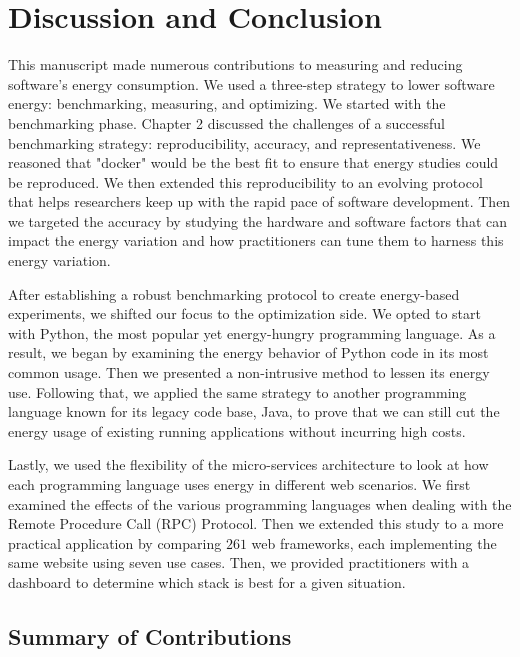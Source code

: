 \clearpage
\chapter{Discussion and Conclusion}
\label{chapter:conclusion}

This manuscript made numerous contributions to measuring and reducing software's energy consumption. We used a three-step strategy to lower software energy:  benchmarking, measuring, and optimizing. 
We started with the benchmarking phase. Chapter 2 discussed the challenges of a successful benchmarking strategy: reproducibility, accuracy, and representativeness. We reasoned that "docker" would be the best fit to ensure that energy studies could be reproduced. We then extended this reproducibility to an evolving protocol that helps researchers keep up with the rapid pace of software development. 
Then we targeted the accuracy by studying the hardware and software factors that can impact the energy variation and how practitioners can tune them to harness this energy variation. 

After establishing a robust benchmarking protocol to create energy-based experiments, we shifted our focus to the optimization side. We opted to start with Python, the most popular yet energy-hungry programming language. As a result, we began by examining the energy behavior of Python code in its most common usage. Then we presented a non-intrusive method to lessen its energy use. Following that, we applied the same strategy to another programming language known for its legacy code base, Java, to prove that we can still cut the energy usage of existing running applications without incurring high costs. 

Lastly, we used the flexibility of the micro-services architecture to look at how each programming language uses energy in different web scenarios. We first examined the effects of the various programming languages when dealing with the Remote Procedure Call (RPC) Protocol. Then we extended this study to a more practical application by comparing $261$ web frameworks, each implementing the same website using seven use cases. Then, we provided practitioners with a dashboard to determine which stack is best for a given situation. 


\section{Summary of Contributions}
\label{section:SummaryofContributions}

